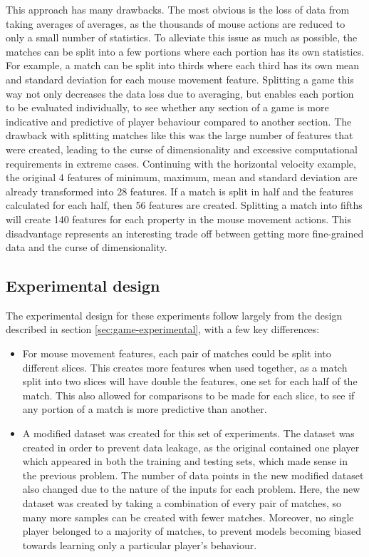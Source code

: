 \documentclass[Report.tex]{subfiles}
\begin{document}
This approach has many drawbacks. The most obvious is the loss of data from taking averages of averages, as the thousands of mouse actions are reduced to only a small number of statistics. To alleviate this issue as much as possible, the matches can be split into a few portions where each portion has its own statistics. For example, a match can be split into thirds where each third has its own mean and standard deviation for each mouse movement feature. Splitting a game this way not only decreases the data loss due to averaging, but enables each portion to be evaluated individually, to see whether any section of a game is more indicative and predictive of player behaviour compared to another section. The drawback with splitting matches like this was the large number of features that were created, leading to the curse of dimensionality and excessive computational requirements in extreme cases. Continuing with the horizontal velocity example, the original 4 features of minimum, maximum, mean and standard deviation are already transformed into 28 features. If a match is split in half and the features calculated for each half, then 56 features are created. Splitting a match into fifths will create 140 features for each property in the mouse movement actions. This disadvantage represents an interesting trade off between getting more fine-grained data and the curse of dimensionality. 

\subsection{Experimental design}
The experimental design for these experiments follow largely from the design described in section \ref{sec:game-experimental}, with a few key differences:
\begin{itemize}
\item For mouse movement features, each pair of matches could be split into different slices. This creates more features when used together, as a match split into two slices will have double the features, one set for each half of the match. This also allowed for comparisons to be made for each slice, to see if any portion of a match is more predictive than another. 
\item A modified dataset was created for this set of experiments. The dataset was created in order to prevent data leakage, as the original contained one player which appeared in both the training and testing sets, which made sense in the previous problem. The number of data points in the new modified dataset also changed due to the nature of the inputs for each problem. Here, the new dataset was created by taking a combination of every pair of matches, so many more samples can be created with fewer matches. Moreover, no single player belonged to a majority of matches, to prevent models becoming biased towards learning only a particular player's behaviour.

\end{itemize}
\end{document}
